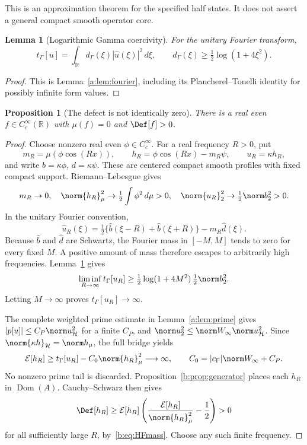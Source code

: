 \documentclass[11pt,a4paper]{article}
\numberwithin{equation}{section}
\newtheorem{proposition}[theorem]{Proposition}
\newtheorem{lemma}[theorem]{Lemma}
\theoremstyle{definition}\newtheorem{definition}[theorem]{Definition}
\theoremstyle{remark}\newtheorem{remark}[theorem]{Remark}
\newcommand{\R}{\mathbb R}\newcommand{\C}{\mathbb C}\newcommand{\N}{\mathbb N}
\newcommand{\E}{\mathcal E}\newcommand{\D}{\mathcal D}
\newcommand{\Hh}{\mathcal H}\newcommand{\Hw}{\mathcal H}
\newcommand{\tg}{t_\Gamma}\newcommand{\cg}{c_\Gamma}
\newcommand{\dom}{\operatorname{Dom}}\newcommand{\Var}{\operatorname{Var}}
\begin{document}
This is an approximation theorem for the specified half states. It does not assert a general compact smooth operator core.

\begin{lemma}[Logarithmic Gamma coercivity]\label{b:lem:fourier}
For the unitary Fourier transform,
\begin{equation}\label{b:eq:multiplier}
 \tg[u]=\int_\R d_\Gamma(\xi)|\widehat u(\xi)|^2\,d\xi,
 \qquad d_\Gamma(\xi)\ge\tfrac12\log(1+4\xi^2).
\end{equation}
\end{lemma}
\begin{proof}
This is Lemma~\ref{a:lem:fourier}, including its Plancherel--Tonelli identity for possibly infinite form values.
\end{proof}

\begin{proposition}[The defect is not identically zero]\label{b:prop:positive}
There is a real even $f\in C_c^\infty(\R)$ with $\mu(f)=0$ and $\Def[f]>0$.
\end{proposition}
\begin{proof}
Choose nonzero real even $\phi\in C_c^\infty$. For a real frequency $R>0$, put
\[
 m_R=\mu(\phi\cos(Rx)),\qquad h_R=\phi\cos(Rx)-m_R\psi,
 \qquad u_R=\kappa h_R,
\]
and write $b=\kappa\phi$, $d=\kappa\psi$. These are centered compact smooth profiles with fixed compact support. Riemann--Lebesgue gives
\begin{equation}\label{b:eq:HFmass}
 m_R\to0,\quad
 \norm{h_R}_\mu^2\to\tfrac12\int\phi^2\,d\mu>0,\quad
 \norm{u_R}_2^2\to\tfrac12\norm b_2^2>0.
\end{equation}
In the unitary Fourier convention,
\[
 \widehat u_R(\xi)=\tfrac12\{\widehat b(\xi-R)+\widehat b(\xi+R)\}
                         -m_R\widehat d(\xi).
\]
Because $\widehat b$ and $\widehat d$ are Schwartz, the Fourier mass in $[-M,M]$ tends to zero for every fixed $M$. A positive amount of mass therefore escapes to arbitrarily high frequencies. Lemma~\ref{b:lem:fourier} gives
\[
 \liminf_{R\to\infty}\tg[u_R]
 \ge\tfrac12\log(1+4M^2)\,\tfrac12\norm b_2^2.
\]
Letting $M\to\infty$ proves $\tg[u_R]\to\infty$.

The complete weighted prime estimate in Lemma~\ref{a:lem:prime} gives
$|p[u]|\le C_P\norm u_{\Hh}^2$ for a finite $C_P$, and
$\norm u_2^2\le\norm W_\infty\norm u_{\Hh}^2$. Since $\norm{\kappa h}_{\Hh}=\norm h_\mu$, the full bridge yields
\[
 \E[h_R]\ge\tg[u_R]-C_0\norm{h_R}_\mu^2\longrightarrow\infty,
 \qquad C_0=|\cg|\norm W_\infty+C_P.
\]
No nonzero prime tail is discarded. Proposition~\ref{b:prop:generator} places each $h_R$ in $\dom(A)$. Cauchy--Schwarz then gives
\[
 \Def[h_R]\ge\E[h_R]
       \left(\frac{\E[h_R]}{\norm{h_R}_\mu^2}-\frac12\right)>0
\]
for all sufficiently large $R$, by~\eqref{b:eq:HFmass}. Choose any such finite frequency.
\end{proof}
\end{document}
